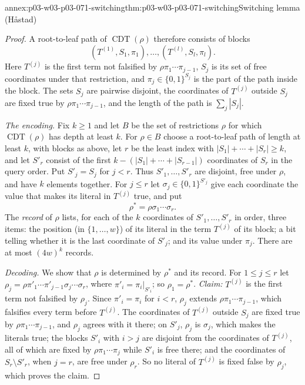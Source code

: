 \begin{annexitem}{annex:p03-w03-p03-071-switching}{thm:p03-w03-p03-071-switching}{Switching lemma (H\aa stad)}
\begin{proof}
A root-to-leaf path of \(\operatorname{CDT}(\rho)\) therefore consists of
blocks
\[
 (T^{(1)},S_1,\pi_1),\ldots,(T^{(l)},S_l,\pi_l).
\]
Here \(T^{(j)}\) is the first term not falsified by \(\rho\pi_1\cdots\pi_{j-1}\), \(S_j\) is its set
of free coordinates under that restriction, and \(\pi_j\in\{0,1\}^{S_j}\) is
the part of the path inside the block.  The sets \(S_j\) are pairwise
disjoint, the coordinates of \(T^{(j)}\) outside \(S_j\) are fixed true by
\(\rho\pi_1\cdots\pi_{j-1}\), and the length of the path is
\(\sum_j|S_j|\).

\emph{The encoding.}  Fix \(k\geq1\) and let \(B\) be the set of
restrictions \(\rho\) for which \(\operatorname{CDT}(\rho)\) has depth at
least \(k\).  For \(\rho\in B\) choose a root-to-leaf path of length at least
\(k\), with blocks as above, let \(r\) be the least index with
\(|S_1|+\cdots+|S_r|\geq k\), and let \(S'_r\) consist of the first
\(k-(|S_1|+\cdots+|S_{r-1}|)\) coordinates of \(S_r\) in the query order.
Put \(S'_j=S_j\) for \(j<r\).  Thus \(S'_1,\ldots,S'_r\) are disjoint, free
under \(\rho\), and have \(k\) elements together.  For \(j\leq r\) let
\(\sigma_j\in\{0,1\}^{S'_j}\) give each coordinate the value that makes its
literal in \(T^{(j)}\) true, and put
\[
  \rho^\ast=\rho\sigma_1\cdots\sigma_r .
\]
The \emph{record} of \(\rho\) lists, for each of the \(k\) coordinates of
\(S'_1,\ldots,S'_r\) in order, three items: the position (in
\(\{1,\ldots,w\}\)) of its literal in the term \(T^{(j)}\) of its block; a
bit telling whether it is the last coordinate of \(S'_j\); and its value
under \(\pi_j\).  There are at most \((4w)^k\) records.

\emph{Decoding.}  We show that \(\rho\) is determined by \(\rho^\ast\) and
its record.  For \(1\leq j\leq r\) let
\(\rho_j=\rho\pi'_1\cdots\pi'_{j-1}\sigma_j\cdots\sigma_r\), where
\(\pi'_i=\pi_i|_{S'_i}\); so \(\rho_1=\rho^\ast\).  \emph{Claim:}
\(T^{(j)}\) is the first term not falsified by \(\rho_j\).  Since
\(\pi'_i=\pi_i\) for \(i<r\), \(\rho_j\) extends
\(\rho\pi_1\cdots\pi_{j-1}\), which falsifies every term before
\(T^{(j)}\).  The coordinates of \(T^{(j)}\) outside \(S_j\)
are fixed true by \(\rho\pi_1\cdots\pi_{j-1}\), and \(\rho_j\) agrees with it
there; on \(S'_j\), \(\rho_j\) is \(\sigma_j\), which makes the literals
true; the blocks \(S'_i\) with \(i>j\) are disjoint from the coordinates of
\(T^{(j)}\), all of which are fixed by \(\rho\pi_1\cdots\pi_j\) while
\(S'_i\) is free there; and the coordinates of \(S_r\setminus S'_r\), when
\(j=r\), are free under \(\rho_r\).  So no literal of \(T^{(j)}\) is fixed
false by \(\rho_j\), which proves the claim.


\end{proof}
\end{annexitem}
